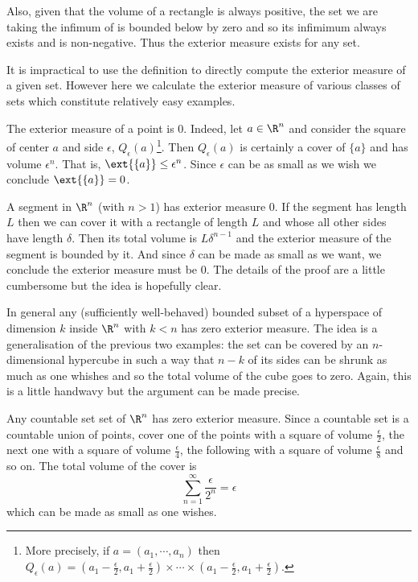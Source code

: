 \documentclass[12pt,oneside]{book}
\begin{document}
Also, given that the volume of a rectangle is always positive, the set we are taking the infimum of is bounded below by zero and so its infimimum always exists and is non-negative. Thus the exterior measure exists for any set. 

\begin{example}
	It is impractical to use the definition to directly compute the exterior measure of a given set. However here we calculate the exterior measure of various classes of sets which constitute relatively easy examples.
	\begin{points}
	\item The exterior measure of a point is 0. Indeed, let \( a \in \R^n \) and consider the square of center \( a \) and side \( \epsilon \), \( Q_\epsilon(a) \)\footnote{More precisely, if \( a = (a_1, \cdots, a_n) \) then \( Q_\epsilon(a) = (a_1 - \frac{\epsilon}{2}, a_1 + \frac{\epsilon}{2}) \times \cdots \times (a_1 - \frac{\epsilon}{2}, a_1 + \frac{\epsilon}{2}) \).}. Then \( Q_\epsilon(a) \) is certainly a cover of \( \{ a\} \) and has volume \( \epsilon^n \). That is, \( \ext{\{ a \}} \leq \epsilon^n \). Since \( \epsilon \) can be as small as we wish we conclude \( \ext{\{ a \}} = 0 \).

	\item A segment in \( \R^n \) (with \( n > 1 \)) has exterior measure 0. If the segment has length \( L \) then we can cover it with a rectangle of length \( L \) and whose all other sides have length \( \delta \). Then its total volume is \( L\delta^{n-1} \) and the exterior measure of the segment is bounded by it. And since \( \delta \) can be made as small as we want, we conclude the exterior measure must be 0. The details of the proof are a little cumbersome but the idea is hopefully clear.

	\item In general any (sufficiently well-behaved) bounded subset of a hyperspace of dimension \( k \) inside \( \R^n \) with \( k < n \) has zero exterior measure. The idea is a generalisation of the previous two examples: the set can be covered by an \( n \)-dimensional hypercube in such a way that \( n - k \) of its sides can be shrunk as much as one whishes and so the total volume of the cube goes to zero. Again, this is a little handwavy but the argument can be made precise. 

	\item Any countable set set of \( \R^n \) has zero exterior measure. Since a countable set is a countable union of points, cover one of the points with a square of volume \( \frac{\epsilon}{2} \), the next one with a square of volume \( \frac{\epsilon}{4} \), the following with a square of volume \( \frac{\epsilon}{8} \) and so on. The total volume of the cover is
		\begin{equation*}
			\sum_{n = 1}^{\infty} \frac{\epsilon}{2^n} = \epsilon 
		\end{equation*}
		which can be made as small as one wishes.
	\end{points}
\end{example}
\end{document}
